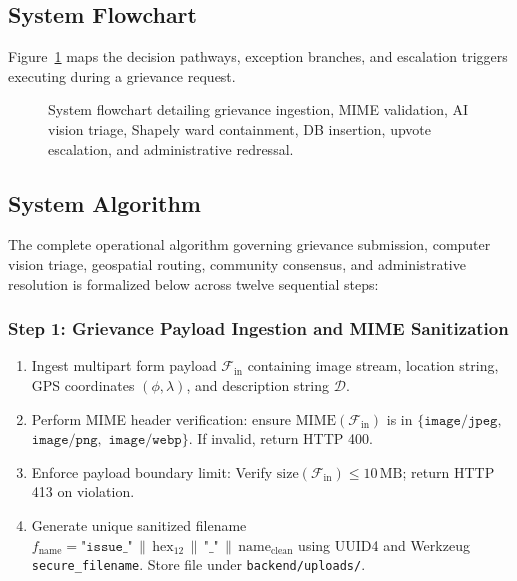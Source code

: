\documentclass[12pt,a4paper]{report}
\begin{document}
\subsection{System Flowchart}
Figure~\ref{fig:multiagent_flowchart} maps the decision pathways, exception branches, and escalation triggers executing during a grievance request.

\begin{figure}[H]
    \centering
    \caption{System flowchart detailing grievance ingestion, MIME validation, AI vision triage, Shapely ward containment, DB insertion, upvote escalation, and administrative redressal.}
    \label{fig:multiagent_flowchart}
\end{figure}

\subsection{System Algorithm}
The complete operational algorithm governing grievance submission, computer vision triage, geospatial routing, community consensus, and administrative resolution is formalized below across twelve sequential steps:

\subsubsection*{Step 1: Grievance Payload Ingestion and MIME Sanitization}
\begin{enumerate}
  \item[\textbf{1.1}] Ingest multipart form payload $\mathcal{F}_{\text{in}}$ containing image stream, location string, GPS coordinates $(\phi, \lambda)$, and description string $\mathcal{D}$.
  \item[\textbf{1.2}] Perform MIME header verification: ensure $\mathrm{MIME}(\mathcal{F}_{\text{in}})$ is in $\{\texttt{image/jpeg},$ $\texttt{image/png},$ $\texttt{image/webp}\}$. If invalid, return HTTP 400.
  \item[\textbf{1.3}] Enforce payload boundary limit: Verify $\mathrm{size}(\mathcal{F}_{\text{in}}) \le 10\,\mathrm{MB}$; return HTTP 413 on violation.
  \item[\textbf{1.4}] Generate unique sanitized filename $f_{\text{name}} = \texttt{"issue\_"} \,\|\, \text{hex}_{12} \,\|\, \texttt{"\_"} \,\|\, \text{name}_{\text{clean}}$ using UUID4 and Werkzeug \texttt{secure\_filename}. Store file under \texttt{backend/uploads/}.
\end{enumerate}
\end{document}
